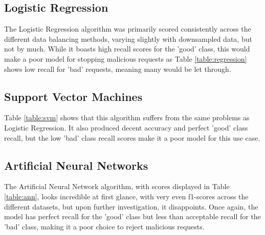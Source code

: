 \documentclass[conference]{IEEEtran}
\begin{document}
    \subsection{Logistic Regression}
    The Logistic Regression algorithm was primarily scored consistently across the different data balancing methods, varying slightly with downsampled data, but not by much. While it boasts high recall scores for the 'good' class, this would make a poor model for stopping malicious requests as Table \ref{table:regression} shows low recall for 'bad' requests, meaning many would be let through.
    
    \subsection{Support Vector Machines}
    Table \ref{table:svm} shows that this algorithm suffers from the same problems as Logistic Regression. It also produced decent accuracy and perfect 'good' class recall, but the low 'bad' class recall scores make it a poor model for this use case.
    
    \subsection{Artificial Neural Networks}
    The Artificial Neural Network algorithm, with scores displayed in Table \ref{table:ann}, looks incredible at first glance, with very even f1-scores across the different datasets, but upon further investigation, it disappoints. Once again, the model has perfect recall for the 'good' class but less than acceptable recall for the 'bad' class, making it a poor choice to reject malicious requests.
\end{document}
